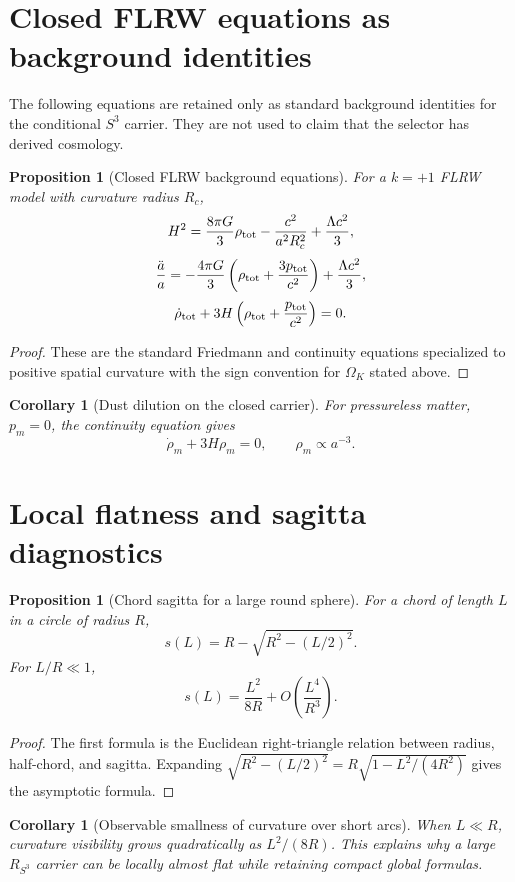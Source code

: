 \documentclass[11pt,a4paper]{article}
\newtheorem{proposition}[theorem]{Proposition}
\newtheorem{corollary}[theorem]{Corollary}
\begin{document}
\section{Closed FLRW equations as background identities}

The following equations are retained only as standard background identities for the conditional $S^3$ carrier.  They are not used to claim that the selector has derived cosmology.

\begin{proposition}[Closed FLRW background equations]
For a $k=+1$ FLRW model with curvature radius $R_c$,
\[
H^2=\frac{8\pi G}{3}\rho_{\rm tot}-\frac{c^2}{a^2R_c^2}+\frac{\Lambda c^2}{3},
\]
\[
\frac{\ddot a}{a}=-\frac{4\pi G}{3}\left(\rho_{\rm tot}+\frac{3p_{\rm tot}}{c^2}\right)+\frac{\Lambda c^2}{3},
\]
\[
\dot\rho_{\rm tot}+3H\left(\rho_{\rm tot}+\frac{p_{\rm tot}}{c^2}\right)=0.
\]
\end{proposition}
\begin{proof}
These are the standard Friedmann and continuity equations specialized to positive spatial curvature with the sign convention for $\Omega_K$ stated above.\end{proof}

\begin{corollary}[Dust dilution on the closed carrier]
For pressureless matter, $p_m=0$, the continuity equation gives
\[
\dot\rho_m+3H\rho_m=0,
\qquad
\rho_m\propto a^{-3}.
\]
\end{corollary}

\section{Local flatness and sagitta diagnostics}

\begin{proposition}[Chord sagitta for a large round sphere]
For a chord of length $L$ in a circle of radius $R$,
\[
s(L)=R-\sqrt{R^2-(L/2)^2}.
\]
For $L/R\ll1$,
\[
s(L)=\frac{L^2}{8R}+O\left(\frac{L^4}{R^3}\right).
\]
\end{proposition}
\begin{proof}
The first formula is the Euclidean right-triangle relation between radius, half-chord, and sagitta.  Expanding
$\sqrt{R^2-(L/2)^2}=R\sqrt{1-L^2/(4R^2)}$ gives the asymptotic formula.\end{proof}

\begin{corollary}[Observable smallness of curvature over short arcs]
When $L\ll R$, curvature visibility grows quadratically as $L^2/(8R)$.  This explains why a large $R_{S^3}$ carrier can be locally almost flat while retaining compact global formulas.
\end{corollary}
\end{document}
